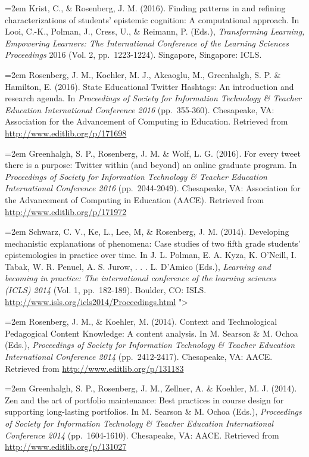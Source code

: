 \documentclass[
  14,
]{article}
\begin{document}
\hangindent=2em Krist, C., \& Rosenberg, J. M. (2016). Finding patterns
in and refining characterizations of students' epistemic cognition: A
computational approach. In Looi, C.-K., Polman, J., Cress, U., \&
Reimann, P. (Eds.), \emph{Transforming Learning, Empowering Learners:
The International Conference of the Learning Sciences Proceedings} 2016
(Vol. 2, pp.~1223-1224). Singapore, Singapore: ICLS.

\hangindent=2em Rosenberg, J. M., Koehler, M. J., Akcaoglu, M.,
Greenhalgh, S. P. \& Hamilton, E. (2016). State Educational Twitter
Hashtags: An introduction and research agenda. In \emph{Proceedings of
Society for Information Technology \& Teacher Education International
Conference 2016} (pp.~355-360). Chesapeake, VA: Association for the
Advancement of Computing in Education. Retrieved from
\url{http://www.editlib.org/p/171698}

\hangindent=2em Greenhalgh, S. P., Rosenberg, J. M. \& Wolf, L. G.
(2016). For every tweet there is a purpose: Twitter within (and beyond)
an online graduate program. In \emph{Proceedings of Society for
Information Technology \& Teacher Education International Conference
2016} (pp.~2044-2049). Chesapeake, VA: Association for the Advancement
of Computing in Education (AACE). Retrieved from
\url{http://www.editlib.org/p/171972}

\hangindent=2em Schwarz, C. V., Ke, L., Lee, M, \& Rosenberg, J. M.
(2014). Developing mechanistic explanations of phenomena: Case studies
of two fifth grade students' epistemologies in practice over time. In J.
L. Polman, E. A. Kyza, K. O'Neill, I. Tabak, W. R. Penuel, A. S. Jurow,
. . . L. D'Amico (Eds.), \emph{Learning and becoming in practice: The
international conference of the learning sciences (ICLS) 2014} (Vol. 1,
pp.~182-189). Boulder, CO: ISLS.
\url{http://www.isls.org/icls2014/Proceedings.html} "\textgreater{}

\hangindent=2em Rosenberg, J. M., \& Koehler, M. (2014). Context and
Technological Pedagogical Content Knowledge: A content analysis. In M.
Searson \& M. Ochoa (Eds.), \emph{Proceedings of Society for Information
Technology \& Teacher Education International Conference 2014}
(pp.~2412-2417). Chesapeake, VA: AACE. Retrieved from
\url{http://www.editlib.org/p/131183}

\hangindent=2em Greenhalgh, S. P., Rosenberg, J. M., Zellner, A. \&
Koehler, M. J. (2014). Zen and the art of portfolio maintenance: Best
practices in course design for supporting long-lasting portfolios. In M.
Searson \& M. Ochoa (Eds.), \emph{Proceedings of Society for Information
Technology \& Teacher Education International Conference 2014}
(pp.~1604-1610). Chesapeake, VA: AACE. Retrieved from
\url{http://www.editlib.org/p/131027}
\end{document}
